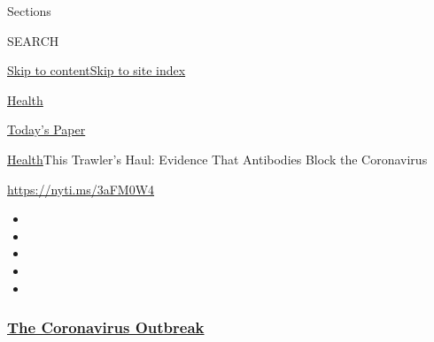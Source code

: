 Sections

SEARCH

\protect\hyperlink{site-content}{Skip to
content}\protect\hyperlink{site-index}{Skip to site index}

\href{https://www.nytimes3xbfgragh.onion/section/health}{Health}

\href{https://myaccount.nytimes3xbfgragh.onion/auth/login?response_type=cookie\&client_id=vi}{}

\href{https://www.nytimes3xbfgragh.onion/section/todayspaper}{Today's
Paper}

\href{/section/health}{Health}\textbar{}This Trawler's Haul: Evidence
That Antibodies Block the Coronavirus

\url{https://nyti.ms/3aFM0W4}

\begin{itemize}
\item
\item
\item
\item
\item
\end{itemize}

\hypertarget{the-coronavirus-outbreak}{%
\subsubsection{\texorpdfstring{\href{https://www.nytimes3xbfgragh.onion/news-event/coronavirus?name=styln-coronavirus-national\&region=TOP_BANNER\&variant=undefined\&block=storyline_menu_recirc\&action=click\&pgtype=Article\&impression_id=25d88400-e38a-11ea-8685-3704dba1db43}{The
Coronavirus
Outbreak}}{The Coronavirus Outbreak}}\label{the-coronavirus-outbreak}}

